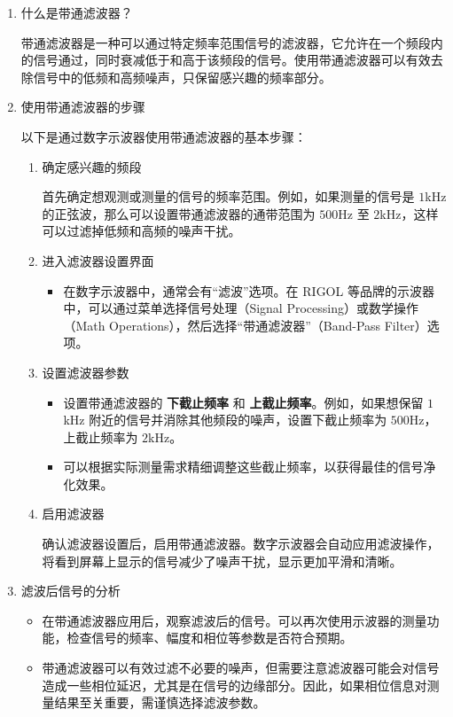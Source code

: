 \begin{enumerate}
	\item 什么是带通滤波器？
	
	带通滤波器是一种可以通过特定频率范围信号的滤波器，它允许在一个频段内的信号通过，同时衰减低于和高于该频段的信号。使用带通滤波器可以有效去除信号中的低频和高频噪声，只保留感兴趣的频率部分。
	
	\item 使用带通滤波器的步骤
	
	以下是通过数字示波器使用带通滤波器的基本步骤：
	
	\begin{enumerate}
		\item 确定感兴趣的频段
		
		首先确定想观测或测量的信号的频率范围。例如，如果测量的信号是 $1$kHz 的正弦波，那么可以设置带通滤波器的通带范围为 $500$Hz 至 $2$kHz，这样可以过滤掉低频和高频的噪声干扰。
		
		\item 进入滤波器设置界面
		\begin{itemize}
			\item 在数字示波器中，通常会有“滤波”选项。在 RIGOL 等品牌的示波器中，可以通过菜单选择信号处理（Signal Processing）或数学操作（Math Operations），然后选择“带通滤波器”（Band-Pass Filter）选项。
		\end{itemize}
		
		\item 设置滤波器参数
		\begin{itemize}
			\item 设置带通滤波器的 \textbf{下截止频率} 和 \textbf{上截止频率}。例如，如果想保留 $1$kHz 附近的信号并消除其他频段的噪声，设置下截止频率为 $500$Hz，上截止频率为 $2$kHz。
			\item 可以根据实际测量需求精细调整这些截止频率，以获得最佳的信号净化效果。
		\end{itemize}
		
		\item 启用滤波器
		
		确认滤波器设置后，启用带通滤波器。数字示波器会自动应用滤波操作，将看到屏幕上显示的信号减少了噪声干扰，显示更加平滑和清晰。
	\end{enumerate}
	
	\item 滤波后信号的分析
	\begin{itemize}
		\item 在带通滤波器应用后，观察滤波后的信号。可以再次使用示波器的测量功能，检查信号的频率、幅度和相位等参数是否符合预期。
		\item 带通滤波器可以有效过滤不必要的噪声，但需要注意滤波器可能会对信号造成一些相位延迟，尤其是在信号的边缘部分。因此，如果相位信息对测量结果至关重要，需谨慎选择滤波参数。
	\end{itemize}
\end{enumerate}

